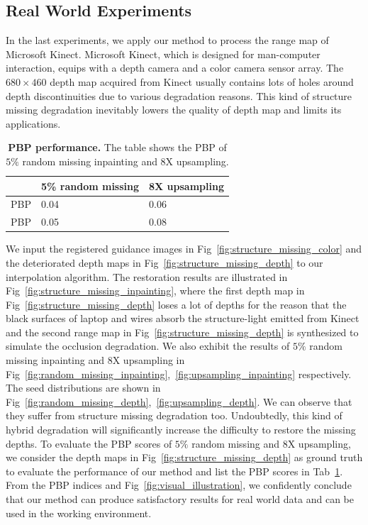 \documentclass[preprint,10pt,5p,times,twocolumn]{elsarticle}
\begin{document}
\subsection{Real World Experiments}






In the last experiments, we apply our method to process the range map of Microsoft Kinect. Microsoft Kinect, which is designed for man-computer interaction, equips with a depth camera and a color camera sensor array. The $680 \times 460$ depth map acquired from Kinect usually contains lots of holes around depth discontinuities due to various degradation reasons. This kind of structure missing degradation inevitably lowers the quality of depth map and limits its applications.

\begin{table}[b]
\centering
\begin{tabular}{|p{0.6cm}<{\centering}|p{3cm}<{\centering}|p{3cm}<{\centering}|}
\hline
& 5\% random missing & 8X upsampling \\
\hline
PBP & 0.04 & 0.06 \\
\hline
PBP & 0.05 & 0.08 \\
\hline
\end{tabular}
\caption{\textbf{PBP performance.} The table shows the PBP of $5\%$ random missing inpainting and 8X upsampling.}
\label{tab:MAD}
\end{table}





We input the registered guidance images in Fig~\ref{fig:structure_missing_color} and the deteriorated depth maps in Fig~\ref{fig:structure_missing_depth} to our interpolation algorithm. The restoration results are illustrated in Fig~\ref{fig:structure_missing_inpainting}, where the first depth map in Fig~\ref{fig:structure_missing_depth} loses a lot of depths for the reason that the black surfaces of laptop and wires absorb the structure-light emitted from Kinect and the second range map in Fig~\ref{fig:structure_missing_depth} is synthesized to simulate the occlusion degradation. We also exhibit the results of $5\%$ random missing inpainting and 8X upsampling in Fig~\ref{fig:random_missing_inpainting},~\ref{fig:upsampling_inpainting} respectively. The seed distributions are shown in Fig~\ref{fig:random_missing_depth},~\ref{fig:upsampling_depth}. We can observe that they suffer from structure missing degradation too. Undoubtedly, this kind of hybrid degradation will significantly increase the difficulty to restore the missing depths. To evaluate the PBP scores of $5\%$ random missing and 8X upsampling, we consider the depth maps in Fig~\ref{fig:structure_missing_depth} as ground truth to evaluate the performance of our method and list the PBP scores in Tab~\ref{tab:MAD}. From the PBP indices and Fig~\ref{fig:visual_illustration}, we confidently conclude that our method can produce satisfactory results for real world data and can be used in the working environment.
\end{document}
